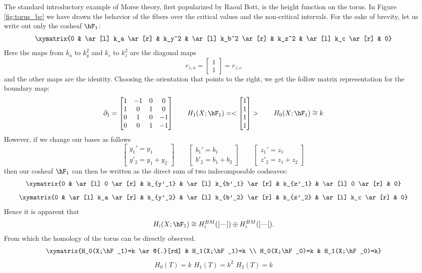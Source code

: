 \begin{ex}
The standard introductory example of Morse theory, first popularized by Raoul Bott, is the height function on the torus. In Figure \ref{fig:torus_bc} we have drawn the behavior of the fibers over the critical values and the non-critical intervals. For the sake of brevity, let us write out only the cosheaf $\hF_1$:
\[
\xymatrix{0 & \ar[l] k_a \ar[r] & k_y^2 & \ar[l] k_b^2 \ar[r] & k_z^2 & \ar[l] k_c \ar[r] & 0}
\]
Here the maps from $k_a$ to $k_y^2$ and $k_c$ to $k_z^2$ are the diagonal maps
\[
 r_{z,a}=\begin{bmatrix}1 \\ 1\end{bmatrix}=r_{z,c}
\]
and the other maps are the identity. Choosing the orientation that points to the right, we get the follow matrix representation for the boundary map:
\[
	\partial_1=\begin{bmatrix}1 & -1 & 0 & 0 \\
					1 & 0 & 1 & 0 \\
					0 & 1 & 0 & -1 \\
					0 & 0 & 1 & -1
	\end{bmatrix}
	\qquad H_1(X;\hF_1)=<\begin{bmatrix} 1 \\ 1 \\1 \\1\end{bmatrix}> \qquad H_0(X;\hF_1)\cong k
\]
However, if we change our bases as follows
\[
	\begin{bmatrix} y_1'= y_1 \\ y'_2=y_1+y_2\end{bmatrix} \qquad \begin{bmatrix} b_1'= b_1 \\ b'_2=b_1+b_2\end{bmatrix} \qquad \begin{bmatrix} z_1'= z_1 \\ z'_2=z_1+z_2\end{bmatrix}
\]
then our cosheaf $\hF_1$ can then be written as the direct sum of two indecomposable cosheaves:
\[
\xymatrix{0 & \ar[l] 0 \ar[r] & k_{y'_1} & \ar[l] k_{b'_1} \ar[r] & k_{z'_1} & \ar[l] 0 \ar[r] & 0}
\]
\[
\xymatrix{0 & \ar[l] k_a \ar[r] & k_{y'_2} & \ar[l] k_{b'_2} \ar[r] & k_{z'_2} & \ar[l] k_c \ar[r] & 0}
\]
Hence it is apparent that
\[
	H_i(X;\hF_1)\cong H_i^{BM}([\textrm{---}])\oplus H_i^{BM}(]\textrm{---}[).
\]
From which the homology of the torus can be directly observed.
\[
\xymatrix{H_0(X;\hF_1)=k \ar@{.}[rd] & H_1(X;\hF_1)=k \\
H_0(X;\hF_0)=k & H_1(X;\hF_0)=k}
\]
\[
H_0(T)=k \,\, H_1(T)=k^2 \,\, H_2(T)=k
\]
\end{ex}

